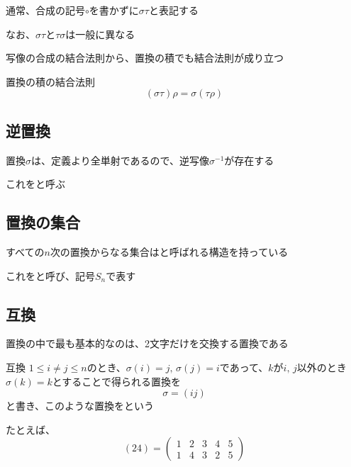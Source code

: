 \documentclass[../../../topic_linear-algebra]{subfiles}
\begin{document}
通常、合成の記号$\circ$を書かずに$\sigma \tau$と表記する

\br

なお、$\sigma\tau$と$\tau\sigma$は一般に異なる

\br

写像の合成の結合法則から、置換の積でも結合法則が成り立つ

\begin{theorem}{置換の積の結合法則}
  \begin{equation*}
    (\sigma \tau) \rho = \sigma (\tau \rho)
  \end{equation*}
\end{theorem}

\subsection{逆置換}

置換$\sigma$は、定義より全単射であるので、逆写像$\sigma^{-1}$が存在する

これをと呼ぶ

\subsection{置換の集合}

すべての$n$次の置換からなる集合はと呼ばれる構造を持っている

これをと呼び、記号$S_n$で表す

\subsection{互換}

置換の中で最も基本的なのは、2文字だけを交換する置換である

\begin{definition}{互換}
  $1 \leq i \neq j \leq n$のとき、$\sigma(i) = j,\, \sigma(j) = i$であって、$k$が$i,\,j$以外のとき$\sigma(k)=k$とすることで得られる置換を
  \begin{equation*}
    \sigma = (ij)
  \end{equation*}
  と書き、このような置換をという
\end{definition}

たとえば、
\begin{equation*}
  (24) = \begin{pmatrix}
    1 & 2 & 3 & 4 & 5 \\
    1 & 4 & 3 & 2 & 5
  \end{pmatrix}
\end{equation*}
\end{document}
